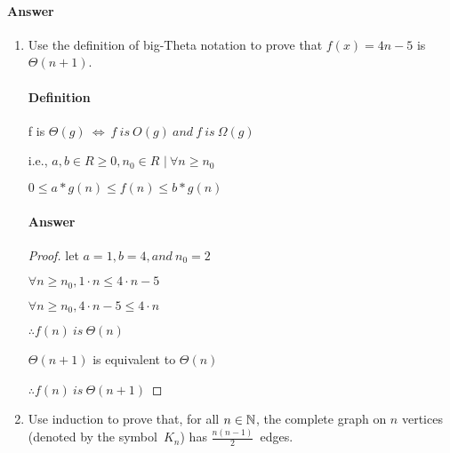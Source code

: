 \documentclass{article}
\begin{document}
\paragraph{Answer}
\todo{}

\collab{\todo{}}

\begin{enumerate}

	\item Use the definition of big-Theta notation to prove that $f(x)=4n-5$
	      is $\Theta(n+1)$.

	      \paragraph{Definition}
	      f is $\Theta(g)\ \iff\ f\ is\ O(g)\ and\ f\ is\ \Omega(g)$

	      i.e., $ a, b \in R \geq 0, n_{0} \in R$
	      $|\ \forall n \geq n_0$

	      $0 \leq a* g(n) \leq f(n) \leq b*g(n)$

	      \paragraph{Answer}
	      \begin{proof}
		      let $a = 1, b = 4, and\ n_0 = 2$

		      $\forall n \geq n_0, 1 \cdot n \leq 4 \cdot n - 5$

		      $\forall n \geq n_0, 4 \cdot n - 5 \leq 4 \cdot n$

		      $\therefore f(n)\ is\ \Theta(n)$

		      $\Theta(n+1)$ is equivalent to $\Theta(n)$

		      $\therefore f(n)\ is\ \Theta(n+1)$
	      \end{proof}

	\item Use induction to prove that, for all $n \in {\mathbb N}$, the complete graph on
	      $n$ vertices (denoted by the symbol~$K_n$) has $\frac{n(n-1)}{2}$~edges.



\end{enumerate}
\end{document}
